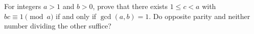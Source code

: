 For integers $a>1$ and $b>0$, prove that there exists $1\le c<a$ with $bc\equiv1\pmod a$ if and only if $\gcd(a,b)=1$. Do opposite parity and neither number dividing the other suffice?

